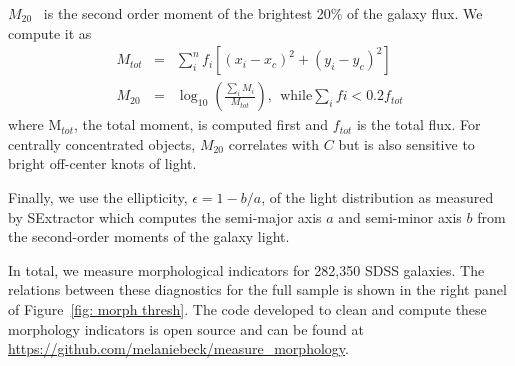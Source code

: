 \documentclass[twocolumn]{aastex6}
\newcommand\aastex{AAS\TeX}
\newcommand{\M}[1]{$M_{\mathrm{#1}}$}
\begin{document}
\M{20}~\citep{Lotz2004} is the second order moment of the brightest 20\% of the galaxy flux. We compute it as
\begin{eqnarray}
 M_{tot} & = & \sum_i^nf_i[(x_i-x_c)^2 + (y_i-y_c)^2]  \\
 M_{20} & = & \log_{10} (\frac{\sum_iM_i}{M_{tot}}), ~~\textrm{while} \sum_ifi < 0.2f_{tot}
\end{eqnarray}
where M$_{tot}$, the total moment, is computed first and $f_{tot}$ is the total flux. For centrally concentrated objects, \M{20} correlates with $C$ but is also sensitive to bright off-center knots of light. 

Finally, we use the ellipticity, $\epsilon = 1 - b/a$, of the light distribution as measured by SExtractor which computes the semi-major axis $a$ and semi-minor axis $b$ from the second-order moments of the galaxy light.  

In total, we measure morphological indicators for 282,350 SDSS galaxies. The relations between these diagnostics for the full sample is shown in the right panel of Figure~\ref{fig: morph thresh}. The code developed to clean and compute these morphology indicators is open source and can be found at \url{https://github.com/melaniebeck/measure_morphology}.







\end{document}

